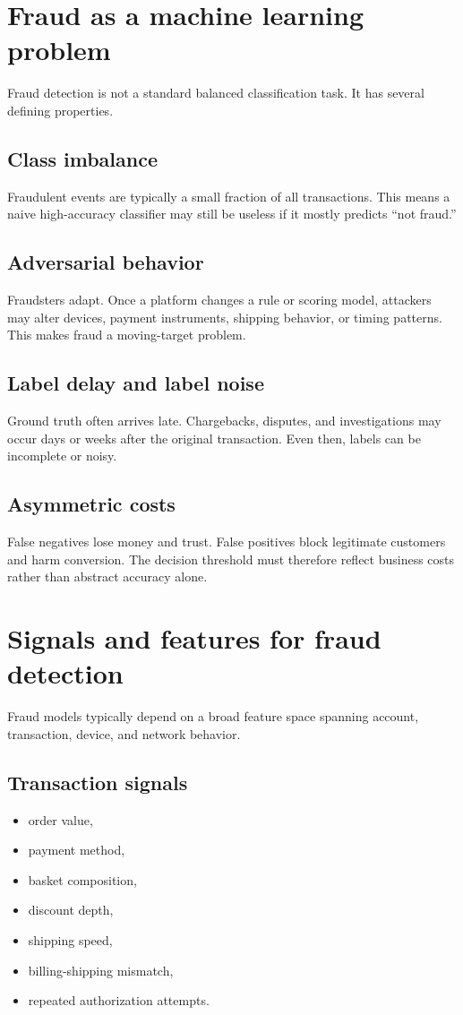 \section{Fraud as a machine learning problem}
Fraud detection is not a standard balanced classification task.
It has several defining properties.

\subsection{Class imbalance}
Fraudulent events are typically a small fraction of all transactions.
This means a naive high-accuracy classifier may still be useless if it mostly predicts ``not fraud.''

\subsection{Adversarial behavior}
Fraudsters adapt.
Once a platform changes a rule or scoring model, attackers may alter devices, payment instruments, shipping behavior, or timing patterns.
This makes fraud a moving-target problem.

\subsection{Label delay and label noise}
Ground truth often arrives late.
Chargebacks, disputes, and investigations may occur days or weeks after the original transaction.
Even then, labels can be incomplete or noisy.

\subsection{Asymmetric costs}
False negatives lose money and trust.
False positives block legitimate customers and harm conversion.
The decision threshold must therefore reflect business costs rather than abstract accuracy alone.

\section{Signals and features for fraud detection}
Fraud models typically depend on a broad feature space spanning account, transaction, device, and network behavior.

\subsection{Transaction signals}
\begin{itemize}
  \item order value,
  \item payment method,
  \item basket composition,
  \item discount depth,
  \item shipping speed,
  \item billing-shipping mismatch,
  \item repeated authorization attempts.
\end{itemize}


